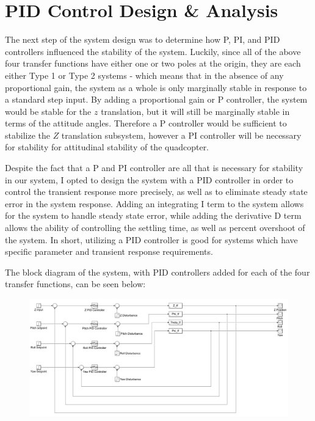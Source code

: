 \documentclass[12pt]{article}
\begin{document}
\section{PID Control Design \& Analysis}
The next step of the system design was to determine how P, PI, and PID controllers influenced
the stability of the system. Luckily, since all of the above four transfer functions have either 
one or two poles at the origin, they are each either Type 1 or Type 2 systems - which means that
in the absence of any proportional gain, the system as a whole is only marginally stable in response
to a standard step input. By adding a proportional gain or P controller, the system would be stable 
for the $z$ translation, but it will still be marginally stable in terms of the attitude angles. Therefore
a P controller would be sufficient to stabilize the $Z$ translation subsystem, however a PI controller will
be necessary for stability for attitudinal stability of the quadcopter.
\par
Despite the fact that a P and PI controller are all that is necessary for stability in our system, 
I opted to design the system with a PID controller in order to control the transient response more 
precisely, as well as to eliminate steady state error in the system response. Adding an integrating I term
to the system allows for the system to handle steady state error, while adding the derivative D term
allows the ability of controlling the settling time, as well as percent overshoot of the system. In short, 
utilizing a PID controller is good for systems which have specific parameter and transient response requirements.
\par
The block diagram of the system, with PID controllers added for each of the four transfer functions, can be seen below:
\begin{figure}[h]
\includegraphics[width=\linewidth]{images/system_block_diagram.png}
\centering
\end{figure}
\end{document}
